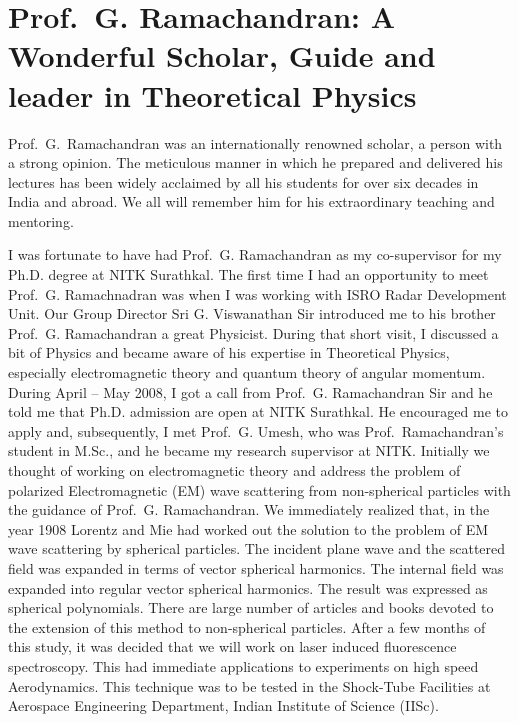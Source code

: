 \chapter[A Wonderful Scholar, Guide and leader in Theoretical Physics]{Prof.\ G. Ramachandran: A Wonderful Scholar, Guide and leader in Theoretical Physics}\label{chap35}


Prof.\ G.\ Ramachandran was an internationally renowned scholar, a person with a strong opinion. The meticulous manner in which he prepared and delivered his lectures has been widely acclaimed by all his students for over six decades in India and abroad. We all will remember him for his extraordinary teaching and mentoring.

I was fortunate to have had Prof.\ G. Ramachandran as my co-supervisor for my Ph.D. degree at NITK Surathkal. The first time I had an opportunity to meet Prof.\ G. Ramachnadran was when I was working with ISRO Radar Development Unit. Our Group Director Sri G. Viswanathan Sir introduced me to his brother Prof.\ G. Ramachandran a great Physicist. During that short visit, I discussed a bit of Physics and became aware of his expertise in Theoretical Physics, especially electromagnetic theory and quantum theory of angular momentum. During April -- May 2008, I got a call from Prof.\ G. Ramachandran Sir and he told me that Ph.D. admission are open at NITK Surathkal. He encouraged me to apply and, subsequently, I met Prof.\ G. Umesh, who was Prof.\ Ramachandran's student in M.Sc., and he became my research supervisor at NITK. Initially we thought of working on electromagnetic theory and address the problem of polarized Electromagnetic (EM) wave scattering from non-spherical particles with the guidance of Prof.\ G. Ramachandran. We immediately realized that, in the year 1908 Lorentz and Mie had worked out the solution to the problem of EM wave scattering by spherical particles. The incident plane wave and the scattered field was expanded in terms of vector spherical harmonics. The internal field was expanded into regular vector spherical harmonics. The result was expressed as spherical polynomials. There are large number of articles and books devoted to the extension of this method to non-spherical particles. After a few months of this study, it was decided that we will work on  laser induced fluorescence spectroscopy. This had immediate applications to experiments on high speed Aerodynamics. This technique was to be tested in the Shock-Tube Facilities at Aerospace Engineering Department, Indian Institute of Science (IISc).

